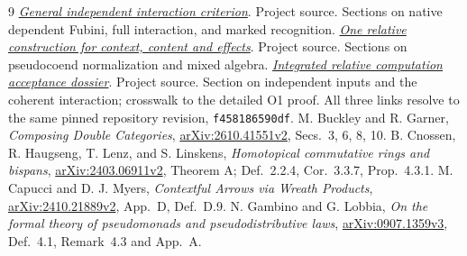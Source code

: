 \documentclass[11pt]{article}
\theoremstyle{definition}
\begin{document}
\begin{thebibliography}{9}
 \href{https://github.com/eternal-november/eos-research-programmes/blob/f458186590df968a516ba73a8eb76fcf044544b0/projects/contextual-composition/interaction/independent-criterion/General_Independent_Interaction_Criterion.tex}{\emph{General independent interaction criterion}}.
Project source. Sections on native dependent Fubini, full interaction,
and marked recognition.
 \href{https://github.com/eternal-november/eos-research-programmes/blob/f458186590df968a516ba73a8eb76fcf044544b0/projects/contextual-composition/foundations/relative-construction/delivery/One_relative_construction_for_context_content_and_effects.tex}{\emph{One relative construction for context, content and effects}}.
Project source. Sections on pseudocoend normalization and mixed algebra.
 \href{https://github.com/eternal-november/eos-research-programmes/blob/f458186590df968a516ba73a8eb76fcf044544b0/projects/contextual-composition/synthesis/Integrated_Relative_Computation_Acceptance_Dossier.tex}{\emph{Integrated relative computation acceptance dossier}}.
Project source. Section on independent inputs and the coherent
interaction; crosswalk to the detailed O1 proof. All three links resolve to
the same pinned repository revision, \texttt{f458186590df}.
 M. Buckley and R. Garner,
\emph{Composing Double Categories},
\href{https://arxiv.org/html/2610.41551v2}{arXiv:2610.41551v2},
Secs.~3, 6, 8, 10.
 B. Cnossen, R. Haugseng, T. Lenz, and S. Linskens,
\emph{Homotopical commutative rings and bispans},
\href{https://arxiv.org/html/2403.06911v2}{arXiv:2403.06911v2},
Theorem A; Def.~2.2.4, Cor.~3.3.7, Prop.~4.3.1.
 M. Capucci and D. J. Myers,
\emph{Contextful Arrows via Wreath Products},
\href{https://arxiv.org/pdf/2410.21889v2}{arXiv:2410.21889v2},
App.~D, Def.~D.9.
 N. Gambino and G. Lobbia,
\emph{On the formal theory of pseudomonads and pseudodistributive laws},
\href{https://arxiv.org/pdf/0907.1359v3}{arXiv:0907.1359v3},
Def.~4.1, Remark~4.3 and App.~A.
\end{thebibliography}
\end{document}
